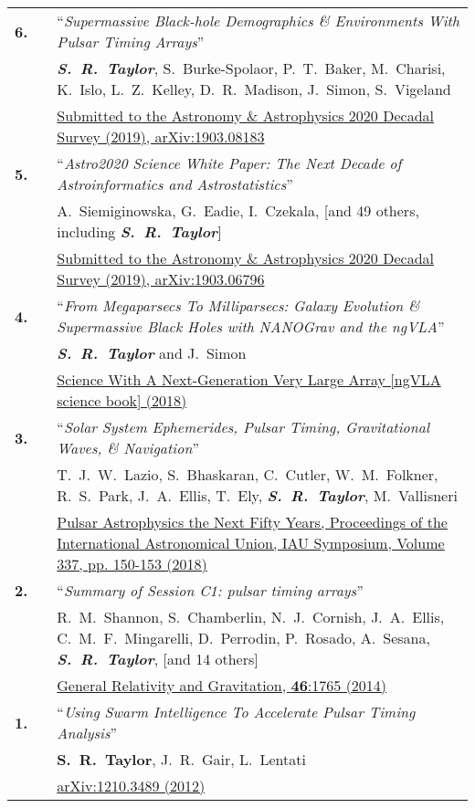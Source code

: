 \documentclass[11pt,letterpaper,sans]{moderncv}
\begin{document}
{\begin{longtable}{rp{0.3cm}p{15.8cm}}
\textbf{6.} & & ``\textit{Supermassive Black-hole Demographics \& Environments With Pulsar Timing Arrays}'' \\ 
&& \textit{\textbf{S.~R.~Taylor}}, S.~Burke-Spolaor, P.~T.~Baker, M.~Charisi, K.~Islo, L.~Z.~Kelley, D.~R.~Madison, J.~Simon, S.~Vigeland \\ 
&& {\color{color1} \href{https://arxiv.org/abs/1903.08183}{Submitted to the Astronomy \& Astrophysics 2020 Decadal Survey (2019), arXiv:1903.08183}} \vspace{0.09cm}\\
\textbf{5.} & & ``\textit{Astro2020 Science White Paper: The Next Decade of Astroinformatics and Astrostatistics}'' \\ 
&& A.~Siemiginowska, G.~Eadie, I.~Czekala, [and 49 others, including \textit{\textbf{S.~R.~Taylor}}] \\ 
&& {\color{color1} \href{https://arxiv.org/abs/1903.06796}{Submitted to the Astronomy \& Astrophysics 2020 Decadal Survey (2019), arXiv:1903.06796}} \vspace{0.09cm}\\
\textbf{4.} & & ``\textit{From Megaparsecs To Milliparsecs: Galaxy Evolution \& Supermassive Black Holes with NANOGrav and the ngVLA}'' \\ 
&& \textit{\textbf{S.~R.~Taylor}} and J.~Simon \\ 
&& \href{http://ngvla.nrao.edu/page/scibook}{{\color{color1} Science With A Next-Generation Very Large Array [ngVLA science book] (2018)}} \vspace{0.09cm}\\
\textbf{3.} & & ``\textit{Solar System Ephemerides, Pulsar Timing, Gravitational Waves, \& Navigation}'' \\ 
&& T.~J.~W.~Lazio, S.~Bhaskaran, C.~Cutler, W.~M.~Folkner, R.~S.~Park, J.~A.~Ellis, T.~Ely, \textit{\textbf{S.~R.~Taylor}}, M.~Vallisneri \\ 
&& \href{https://doi.org/10.1017/S1743921317009711}{{\color{color1} Pulsar Astrophysics the Next Fifty Years, Proceedings of the International Astronomical Union, IAU Symposium, Volume 337, pp. 150-153 (2018)}} \vspace{0.09cm}\\
\textbf{2.} & & ``\textit{Summary of Session C1: pulsar timing arrays}'' \\ 
&& R.~M.~Shannon, S.~Chamberlin, N.~J.~Cornish, J.~A.~Ellis, C.~M.~F.~Mingarelli, D.~Perrodin, P.~Rosado, A.~Sesana, \textit{\textbf{S.~R.~Taylor}}, [and 14 others] \\ 
&& \href{http://link.springer.com/article/10.1007\%2Fs10714-014-1765-4}{{\color{color1} General Relativity and Gravitation, \textbf{46}:1765 (2014)}} \vspace{0.09cm}\\
\textbf{1.} & & ``\textit{Using Swarm Intelligence To Accelerate Pulsar Timing Analysis}'' \\ 
&& \textbf{S.~R.~Taylor}, J.~R.~Gair, L.~Lentati \\ 
&& \href{https://arxiv.org/abs/1210.3489}{{\color{color1} arXiv:1210.3489 (2012)}} \vspace{0.09cm}\\
\end{longtable}
}
\end{document}
